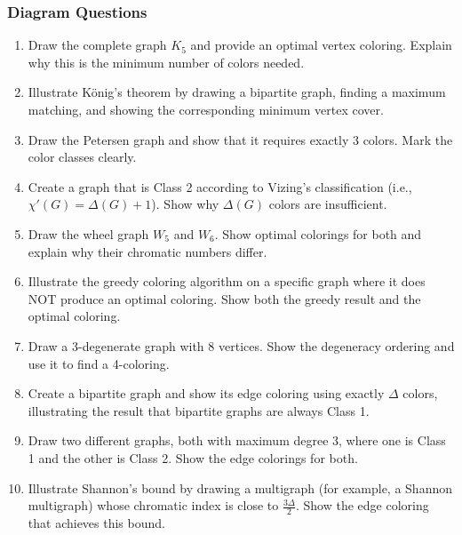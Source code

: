 \documentclass{article}
\theoremstyle{definition}
\begin{document}
\subsubsection{Diagram Questions}
\begin{enumerate}[start=31]
\item Draw the complete graph $K_5$ and provide an optimal vertex coloring. Explain why this is the minimum number of colors needed.

\item Illustrate König's theorem by drawing a bipartite graph, finding a maximum matching, and showing the corresponding minimum vertex cover.

\item Draw the Petersen graph and show that it requires exactly 3 colors. Mark the color classes clearly.

\item Create a graph that is Class 2 according to Vizing's classification (i.e., $\chi'(G) = \Delta(G) + 1$). Show why $\Delta(G)$ colors are insufficient.

\item Draw the wheel graph $W_5$ and $W_6$. Show optimal colorings for both and explain why their chromatic numbers differ.

\item Illustrate the greedy coloring algorithm on a specific graph where it does NOT produce an optimal coloring. Show both the greedy result and the optimal coloring.

\item Draw a 3-degenerate graph with 8 vertices. Show the degeneracy ordering and use it to find a 4-coloring.

\item Create a bipartite graph and show its edge coloring using exactly $\Delta$ colors, illustrating the result that bipartite graphs are always Class 1.

\item Draw two different graphs, both with maximum degree 3, where one is Class 1 and the other is Class 2. Show the edge colorings for both.

\item Illustrate Shannon's bound by drawing a multigraph (for example, a Shannon multigraph) whose chromatic index is close to $\frac{3\Delta}{2}$. Show the edge coloring that achieves this bound.
\end{enumerate}


\pagebreak
\clearpage
\newpage
\end{document}
